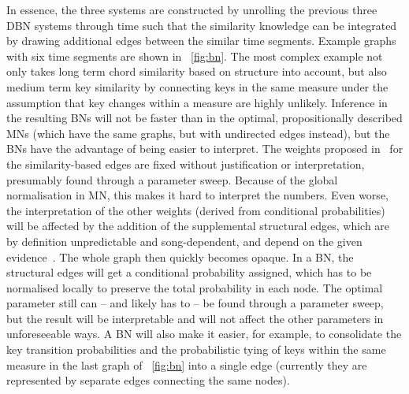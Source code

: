\documentclass[letterpaper]{article} %
\newcommand{\figref}[1]{\figurename~\ref{fig:#1}} %
\begin{document}
In essence, the three systems are constructed by unrolling the previous three DBN systems through time such that the similarity knowledge can be integrated by drawing additional edges between the similar time segments. Example graphs with six time segments are shown in \figref{bn}. The most complex example not only takes long term chord similarity based on structure into account, but also medium term key similarity by connecting keys in the same measure under the assumption that key changes within a measure are highly unlikely. Inference in the resulting BNs will not be faster than in the optimal, propositionally described MNs (which have the same graphs, but with undirected edges instead), but the BNs have the advantage of being easier to interpret. The weights proposed in~\cite{papadopoulos2017taslp} for the similarity-based edges are fixed without justification or interpretation, presumably found through a parameter sweep. Because of the global normalisation in MN, this makes it hard to interpret the numbers. Even worse, the interpretation of the other weights (derived from conditional probabilities) will be affected by the addition of the supplemental structural edges, which are by definition unpredictable and song-dependent, and depend on the given evidence~\cite{jain2011ki}. The whole graph then quickly becomes opaque. In a BN, the structural edges will get a conditional probability assigned, which has to be normalised locally to preserve the total probability in each node. The optimal parameter still can -- and likely has to -- be found through a parameter sweep, but the result will be interpretable and will not affect the other parameters in unforeseeable ways. A BN will also make it easier, for example, to consolidate the key transition probabilities and the probabilistic tying of keys within the same measure in the last graph of \figref{bn} into a single edge (currently they are represented by separate edges connecting the same nodes).









\vspace{-2.14mm}
\end{document}
